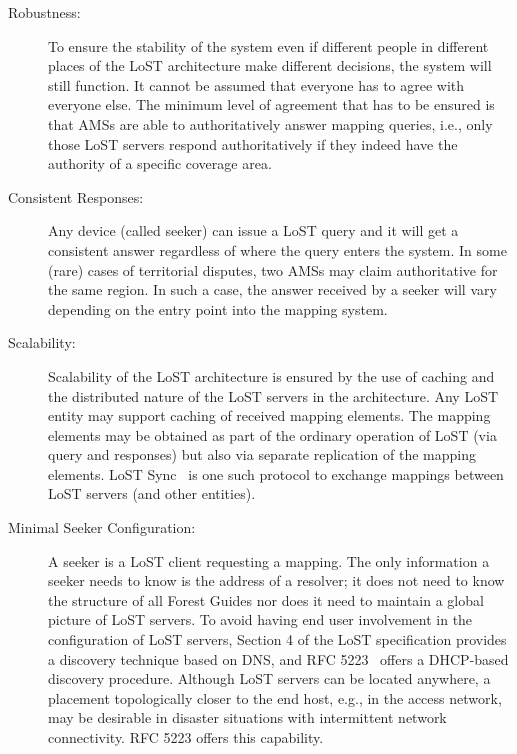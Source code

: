\documentclass[12pt]{article}
\begin{document}
\begin{description}

\item [Robustness: ] To ensure the stability of the system even if different people in different places of the LoST architecture make different decisions, the system will still function. It cannot be assumed that everyone has to agree with everyone else. The minimum level of agreement that has to be ensured is that AMSs are able to authoritatively answer mapping queries, i.e., only those LoST servers respond authoritatively if they indeed have the authority of a specific coverage area. 

\item [Consistent Responses: ]  Any device (called seeker) can issue a LoST query and it will get a consistent answer regardless of where the query enters the system. In some (rare) cases of territorial disputes, two AMSs may claim  authoritative for the same region. In such a case, the answer received by a seeker will vary depending on the entry point into the mapping system. 

\item [Scalability: ] Scalability of the LoST architecture is ensured by the use of caching and the distributed nature of the LoST servers in the architecture. Any LoST entity may support caching of received mapping elements. The mapping elements may be obtained as part of the ordinary operation of LoST (via query and responses) but also via separate replication of the mapping elements. LoST Sync~\cite{rfc6739} is one such protocol to exchange mappings between LoST servers (and other entities).

\item [Minimal Seeker Configuration:] A seeker is a LoST client requesting a mapping. The only information a seeker needs to know is the address of a resolver; it does not need to know the structure of all Forest Guides nor does it need to maintain a global picture of LoST servers. To avoid having end user involvement in the configuration of LoST servers, Section 4 of the LoST specification provides a discovery technique based on DNS, and RFC 5223~\cite{rfc5223} offers a DHCP-based discovery procedure. Although LoST servers can be located anywhere,  a placement topologically closer to the end host, e.g., in the access network, may be desirable in disaster situations with intermittent network connectivity. RFC 5223 offers this capability.

\end{description}
\end{document}
